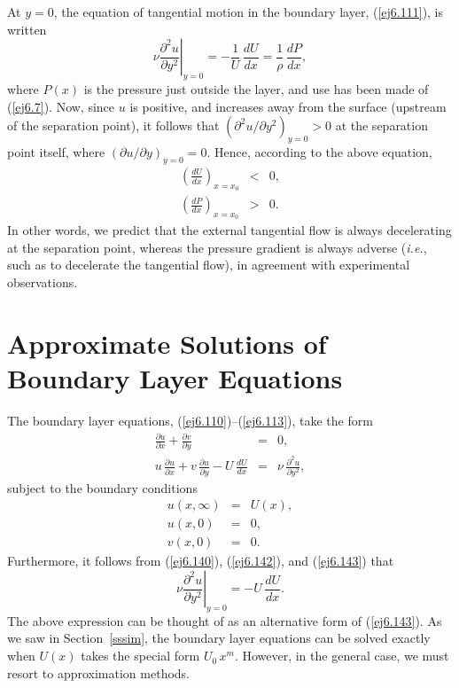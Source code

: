 At $y=0$, the equation of tangential motion in the boundary layer, (\ref{ej6.111}),
is written
\begin{equation}
\nu\left.\frac{\partial^2 u}{\partial y^2}\right|_{y=0} = -\frac{1}{U}\,\frac{dU}{dx} = \frac{1}{\rho}\,\frac{dP}{dx},
\end{equation}
where $P(x)$ is the pressure just outside the  layer, and use has been made of (\ref{ej6.7}). Now, since $u$
is positive, and increases away from the surface (upstream of the separation point), it follows that $(\partial^2 u/\partial y^2)_{y=0}>0$ at the separation point itself, where $(\partial u/\partial y)_{y=0}=0$. Hence, according to the above equation,
\begin{eqnarray}
\left(\frac{dU}{dx}\right)_{x=x_0} &<&0,\\[0.5ex]
\left(\frac{dP}{dx}\right)_{x=x_0}& >& 0.
\end{eqnarray}
In other words, we predict that the external tangential flow is always decelerating at the separation point, whereas the pressure gradient is always 
adverse ({\em i.e.}, such as to decelerate the tangential flow), in agreement with experimental observations. 

\section{Approximate Solutions of  Boundary Layer Equations}\label{sblapp}
The boundary layer equations, (\ref{ej6.110})--(\ref{ej6.113}), take the form
\begin{eqnarray}
\frac{\partial u}{\partial x} + \frac{\partial v}{\partial y} &=&0,\\[0.5ex]
u\,\frac{\partial u}{\partial x} + v\,\frac{\partial u}{\partial y} - U\,\frac{dU}{dx}& =& \nu\,\frac{\partial^2 u}{\partial y^2},\label{ej6.140}
\end{eqnarray}
subject to the boundary conditions
\begin{eqnarray}
u(x,\infty) &=& U(x),\label{ej6.141}\\[0.5ex]
u(x,0)&=&0,\label{ej6.142}\\[0.5ex]
v(x,0)&=&0.\label{ej6.143}
\end{eqnarray}
Furthermore, it follows from (\ref{ej6.140}), (\ref{ej6.142}), and (\ref{ej6.143}) that
\begin{equation}\label{ej6.144}
\nu\left.\frac{\partial^2 u}{\partial y^2}\right|_{y=0} =  -U\,\frac{dU}{dx}.
\end{equation}
The above expression can be thought of as an alternative form of (\ref{ej6.143}).
As we saw in Section~\ref{sssim}, the boundary layer equations can be solved exactly when $U(x)$ takes the special form $U_0\,x^m$. 
However, in the general case, we must resort to approximation methods. 

